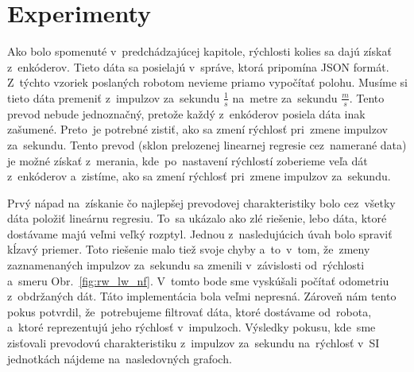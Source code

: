 
\section{Experimenty}
\label{sec:experimenty}

Ako bolo spomenuté v~predchádzajúcej kapitole, rýchlosti kolies sa dajú získať z~enkóderov. Tieto dáta sa posielajú v~správe, ktorá pripomína JSON formát.
Z~týchto vzoriek poslaných robotom nevieme priamo vypočítať polohu. Musíme si tieto dáta premeniť z~impulzov za~sekundu \(\frac{1}{s}\) na~metre
za~sekundu \(\frac{m}{s}\). Tento prevod nebude jednoznačný, pretože každý z~enkóderov posiela dáta inak zašumené. Preto~je potrebné zistiť, ako sa zmení
rýchlosť pri~zmene impulzov za~sekundu. Tento prevod (sklon prelozenej linearnej regresie cez~namerané data) je možné získať z~merania, kde~po~nastavení
rýchlostí zoberieme veľa dát z~enkóderov a~zistíme, ako sa zmení rýchlosť pri~zmene impulzov za~sekundu.

Prvý nápad na~získanie čo najlepšej prevodovej charakteristiky bolo cez~všetky dáta položiť lineárnu regresiu. To~sa ukázalo ako zlé riešenie, lebo dáta,
ktoré dostávame majú veľmi veľký rozptyl. Jednou z~nasledujúcich úvah bolo spraviť kĺzavý priemer. Toto riešenie malo tiež svoje chyby a~to~v~tom, že~zmeny
zaznamenaných impulzov za~sekundu sa zmenili v~závislosti od~rýchlosti a~smeru Obr.~\ref{fig:rw_lw_nf}. V~tomto bode sme vyskúšali počítať odometriu
z~obdržaných dát. Táto implementácia bola veľmi nepresná. Zároveň nám tento pokus potvrdil, že~potrebujeme filtrovať dáta, ktoré dostávame
od~robota, a~ktoré reprezentujú jeho rýchlosť v~impulzoch. Výsledky pokusu, kde~sme zisťovali prevodovú charakteristiku z~impulzov za~sekundu na~rýchlosť
v~SI jednotkách nájdeme na~nasledovných grafoch.

